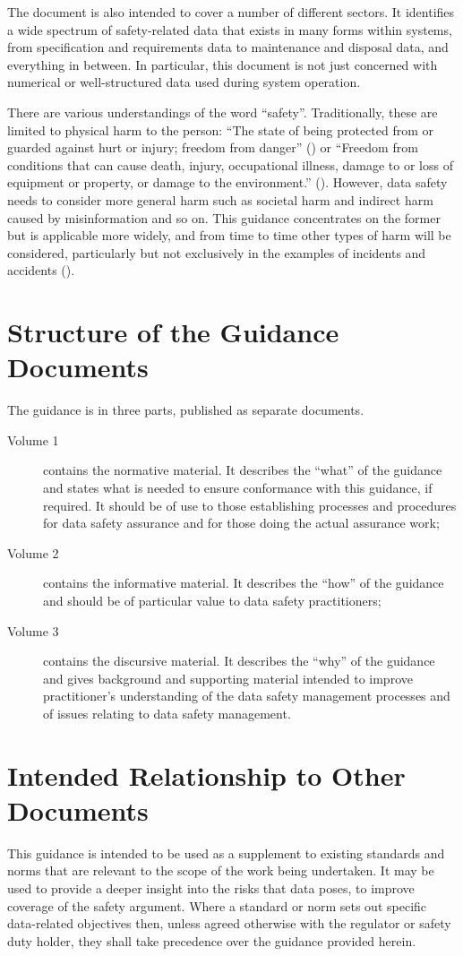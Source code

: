 The document is also intended to cover a number of different sectors. It identifies a wide spectrum of safety-related data that exists in many forms within systems, from specification and requirements data to maintenance and disposal data, and everything in between. In particular, this document is not just concerned with numerical or well-structured data used during system operation.

There are various understandings of the word ``\gls{safety}''. Traditionally, these are limited to physical harm to the person: ``The state of being protected from or guarded against hurt or injury; freedom from danger'' (\cite{citation:oedsafety}) or  ``Freedom from conditions that can cause death, injury, occupational
illness, damage to or loss of equipment or property, or damage to the environment.'' (\cite{citation:milstd882}). However, data safety needs to consider more general harm such as societal harm and indirect harm caused by misinformation and so on. This guidance concentrates on the former but is applicable more widely, and from time to time other types of harm will be considered, particularly but not exclusively in the examples of incidents and accidents ().

\section{Structure of the Guidance Documents}
The guidance is in three parts, published as separate documents.
\begin{description}
	\item[Volume 1] contains the normative material. It describes the ``what'' of the guidance and states what is needed to ensure conformance with this guidance, if required. It should be of use to those establishing processes and procedures for data safety assurance and for those doing the actual assurance work;
	\item[Volume 2] contains the informative material. It describes the ``how'' of the guidance and should be of particular value to data safety practitioners;
	\item[Volume 3] contains the discursive material. It describes the ``why'' of the guidance and gives background and supporting material intended to improve practitioner's understanding of the data safety management processes and of issues relating to data safety management.
\end{description}

\section{Intended Relationship to Other Documents}
This guidance is intended to be used as a supplement to existing standards and norms that are relevant to the scope of the work being undertaken. It may be used to provide a deeper insight into the risks that data poses, to improve coverage of the safety argument. Where a standard or norm sets out specific data-related objectives then, unless agreed otherwise with the regulator or safety duty holder, they shall take precedence over the guidance provided herein.

